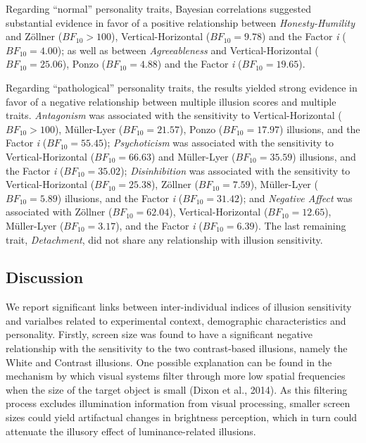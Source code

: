 \documentclass[
  man,floatsintext]{apa6}
\begin{document}
Regarding ``normal'' personality traits, Bayesian correlations suggested substantial evidence in favor of a positive relationship between \emph{Honesty-Humility} and Zöllner (\(BF_{10} > 100\)), Vertical-Horizontal (\(BF_{10} = 9.78\)) and the Factor \emph{i} (\(BF_{10} = 4.00\)); as well as between \emph{Agreeableness} and Vertical-Horizontal (\(BF_{10} = 25.06\)), Ponzo (\(BF_{10} = 4.88\)) and the Factor \emph{i} (\(BF_{10} = 19.65\)).

Regarding ``pathological'' personality traits, the results yielded strong evidence in favor of a negative relationship between multiple illusion scores and multiple traits. \emph{Antagonism} was associated with the sensitivity to Vertical-Horizontal (\(BF_{10} > 100\)), Müller-Lyer (\(BF_{10} = 21.57\)), Ponzo (\(BF_{10} = 17.97\)) illusions, and the Factor \emph{i} (\(BF_{10} = 55.45\)); \emph{Psychoticism} was associated with the sensitivity to Vertical-Horizontal (\(BF_{10} = 66.63\)) and Müller-Lyer (\(BF_{10} = 35.59\)) illusions, and the Factor \emph{i} (\(BF_{10} = 35.02\)); \emph{Disinhibition} was associated with the sensitivity to Vertical-Horizontal (\(BF_{10} = 25.38\)), Zöllner (\(BF_{10} = 7.59\)), Müller-Lyer (\(BF_{10} = 5.89\)) illusions, and the Factor \emph{i} (\(BF_{10} = 31.42\)); and \emph{Negative Affect} was associated with Zöllner (\(BF_{10} = 62.04\)), Vertical-Horizontal (\(BF_{10} = 12.65\)), Müller-Lyer (\(BF_{10} = 3.17\)), and the Factor \emph{i} (\(BF_{10} = 6.39\)). The last remaining trait, \emph{Detachment}, did not share any relationship with illusion sensitivity.

\hypertarget{discussion-2}{%
\subsection{Discussion}\label{discussion-2}}

We report significant links between inter-individual indices of illusion sensitivity and varialbes related to experimental context, demographic characteristics and personality. Firstly, screen size was found to have a significant negative relationship with the sensitivity to the two contrast-based illusions, namely the White and Contrast illusions. One possible explanation can be found in the mechanism by which visual systems filter through more low spatial frequencies when the size of the target object is small (Dixon et al., 2014). As this filtering process excludes illumination information from visual processing, smaller screen sizes could yield artifactual changes in brightness perception, which in turn could attenuate the illusory effect of luminance-related illusions.
\end{document}
